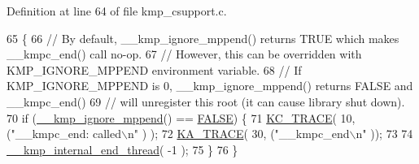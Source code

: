 Definition at line 64 of file kmp\-\_\-csupport.\-c.


\begin{DoxyCode}
65 \{
66     \textcolor{comment}{// By default, \_\_kmp\_ignore\_mppend() returns TRUE which makes \_\_kmpc\_end() call no-op.}
67     \textcolor{comment}{// However, this can be overridden with KMP\_IGNORE\_MPPEND environment variable.}
68     \textcolor{comment}{// If KMP\_IGNORE\_MPPEND is 0, \_\_kmp\_ignore\_mppend() returns FALSE and \_\_kmpc\_end()}
69     \textcolor{comment}{// will unregister this root (it can cause library shut down).}
70     \textcolor{keywordflow}{if} (\hyperlink{kmp_8h_af5c4899a5713f6d8c209fc1bfb57d07b}{\_\_kmp\_ignore\_mppend}() == \hyperlink{kmp_8h_aa93f0eb578d23995850d61f7d61c55c1}{FALSE}) \{
71         \hyperlink{kmp__debug_8h_ab49eefbf8c74cfe98a90ce7ec8864add}{KC\_TRACE}( 10, (\textcolor{stringliteral}{"\_\_kmpc\_end: called\(\backslash\)n"} ) );
72         \hyperlink{kmp__debug_8h_a21d51f37cb197aca5ffe737531678830}{KA\_TRACE}( 30, (\textcolor{stringliteral}{"\_\_kmpc\_end\(\backslash\)n"} ));
73 
74         \hyperlink{kmp_8h_a646b72cce4c269157b34badbcececa9f}{\_\_kmp\_internal\_end\_thread}( -1 );
75     \}
76 \}
\end{DoxyCode}
